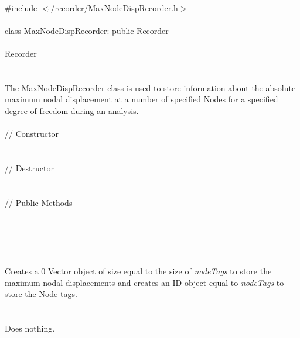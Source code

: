 
   \\
\indent \#include $<\tilde{ }$/recorder/MaxNodeDispRecorder.h$>$  \\

  \\
\indent class MaxNodeDispRecorder: public Recorder\\

 \\
\indent Recorder \\
\indent{} \\

  \\
\indent The MaxNodeDispRecorder class is used to store information
about the absolute maximum nodal displacement at a number of specified
Nodes for a specified degree of freedom during an analysis. \\

 \\
\indent // Constructor \\
\\ \\ 
\indent // Destructor \\
\\ \\
\indent // Public Methods  \\
\\
\\
\\ 

  \\
\\ 
Creates a $0$ Vector object of size equal to the size of {\em
nodeTags} to store the maximum nodal displacements
and creates an ID object equal to {\em nodeTags} to store the Node
tags. \\

 \\
\\ 
Does nothing. \\

